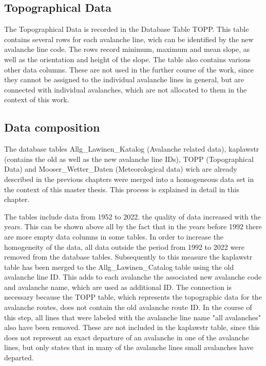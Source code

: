 \documentclass[12pt,a4paper]{article}
\begin{document}
\subsection{Topographical Data}
The Topographical Data is recorded in the Database Table TOPP. This table contains several rows for each avalanche line, wich can be identified by the new avalanche line code. The rows record minimum, maximum and mean slope, as well as the orientation and height of the slope. The table also contains various other data columns. These are not used in the further course of the work, since they cannot be assigned to the individual avalanche lines in general, but are connected with individual avalanches, which are not allocated to them in the context of this work. 




\subsection{Data composition}
 
The database tables Allg\_Lawinen\_Katalog (Avalanche related data), kaplawstr (contains the old as well as the new avalanche line IDs), TOPP (Topographical Data) and Mooser\_Wetter\_Daten (Meteorological data) wich are already described in the previous chapters were merged into a homogeneous data set in the context of this master thesis. This process is explained in detail in this chapter. 

	
The tables include data from 1952 to 2022. the quality of data increased with the years. This can be shown above all by the fact that in the years before 1992 there are more empty data columns in some tables. In order to increase the homogeneity of the data, all data outside the period from 1992 to 2022 were removed from the database tables. Subsequently to this measure  the kaplawstr table has been merged to the Allg\_Lawinen\_Catalog table using the old avalanche line ID. This adds to each avalanche the associated new avalanche code and avalanche name, which are used as additional ID. The connection is necessary because the TOPP table, which represents the topographic data for the avalanche routes, does not contain the old avalanche route ID. In the course of this step, all lines that were labeled with the avalanche line name "all avalanches" also have been removed. These are not included in the kaplawstr table, since this does not represent an exact departure of an avalanche in one of the avalanche lines, but only states that in many of the avalanche lines small avalanches have departed. 
\end{document}
